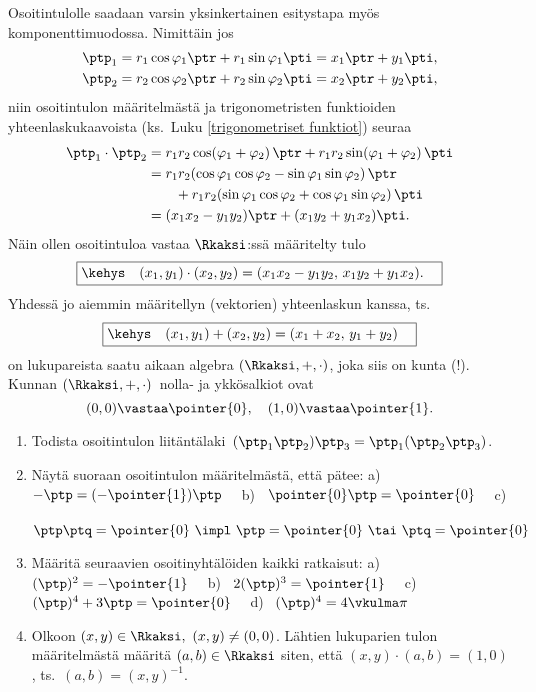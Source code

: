 Osoitintulolle saadaan varsin yksinkertainen esitystapa myös komponenttimuodossa. Nimittäin
jos
\begin{align*}
\ptp_1 &= r_1 \cos{\varphi_1} \ptr + r_1 \sin{\varphi_1} \pti = x_1 \ptr + y_1 \pti, \\
\ptp_2 &= r_2 \cos{\varphi_2} \ptr + r_2 \sin{\varphi_2} \pti = x_2 \ptr + y_2 \pti,
\end{align*}
niin osoitintulon määritelmästä ja trigonometristen funktioiden yhteenlaskukaavoista 
(ks.\ Luku \ref{trigonometriset funktiot}) seuraa
\begin{align*}
\ptp_1 \cdot \ptp_2 &= r_1r_2 \cos({\varphi_1 + \varphi_2})\,\ptr 
                                + r_1r_2 \sin({\varphi_1 + \varphi_2})\,\pti \\
                    &= r_1r_2 (\cos{\varphi_1} \cos{\varphi_2} 
                                - \sin{\varphi_1} \sin{\varphi_2})\,\ptr \\
                    & \qquad + r_1r_2 (\sin{\varphi_1} \cos{\varphi_2} 
                                + \cos{\varphi_1} \sin{\varphi_2})\,\pti \\
                    &= (x_1x_2-y_1y_2)\ptr + (x_1y_2 + y_1x_2)\pti.
\end{align*}
Näin ollen osoitintuloa vastaa $\Rkaksi$:ssä määritelty tulo
\begin{equation} \label{kertolasku}
\boxed{\kehys\quad (x_1,y_1) \cdot (x_2,y_2) = (x_1x_2-y_1y_2,\,x_1y_2 + y_1x_2). \quad}
\end{equation}
Yhdessä jo aiemmin määritellyn (vektorien) yhteenlaskun kanssa, ts.
\begin{equation} \label{yhteenlasku}
\boxed{\kehys\quad (x_1,y_1) +(x_2,y_2) = (x_1 + x_2,\,y_1 + y_2) \quad}
\end{equation}
on lukupareista saatu aikaan algebra $(\Rkaksi,+,\cdot)$, joka siis on kunta (!). Kunnan
$(\Rkaksi,+,\cdot)\,$ nolla- ja ykkösalkiot ovat
\[
(0,0)\vastaa\pointer{0}, \quad (1,0)\vastaa\pointer{1}.
\]

\Harj
\begin{enumerate}

\item \label{H-III-1: osoitintulon liitäntälaki}
Todista osoitintulon liitäntälaki $\,(\ptp_1\ptp_2)\ptp_3=\ptp_1(\ptp_2\ptp_3)$.

\item
Näytä suoraan osoitintulon määritelmästä, että pätee: \newline
a) \ $-\ptp=(-\pointer{1})\ptp \quad$ 
b) \ $\pointer{0}\ptp=\pointer{0} \quad$
c) \ $\ptp\ptq=\pointer{0}\ \impl\ \ptp=\pointer{0}\ \tai\ \ptq=\pointer{0}$

\item
Määritä seuraavien osoitinyhtälöiden kaikki ratkaisut: \newline
a) \ $(\ptp)^2=-\pointer{1} \quad$ 
b) \ $2(\ptp)^3=\pointer{1} \quad$
c) \ $(\ptp)^4+3\ptp=\pointer{0} \quad$
d) \ $(\ptp)^4=4\vkulma\pi$

\item
Olkoon $(x,y)\in\Rkaksi,\ (x,y) \neq (0,0)$. Lähtien lukuparien tulon määritelmästä 
määritä $(a,b)\in\Rkaksi$ siten, että $(x,y)\cdot(a,b)=(1,0)$, ts.\ $(a,b)=(x,y)^{-1}$.
 
\end{enumerate}